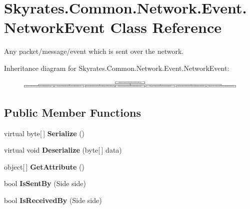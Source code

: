 \hypertarget{class_skyrates_1_1_common_1_1_network_1_1_event_1_1_network_event}{\section{Skyrates.\-Common.\-Network.\-Event.\-Network\-Event Class Reference}
\label{class_skyrates_1_1_common_1_1_network_1_1_event_1_1_network_event}
}


Any packet/message/event which is sent over the network.  


Inheritance diagram for Skyrates.\-Common.\-Network.\-Event.\-Network\-Event\-:\begin{figure}[H]
\begin{center}
\leavevmode
\includegraphics[height=0.432432cm]{class_skyrates_1_1_common_1_1_network_1_1_event_1_1_network_event}
\end{center}
\end{figure}
\subsection*{Public Member Functions}
\begin{DoxyCompactItemize}
\item 
\hypertarget{class_skyrates_1_1_common_1_1_network_1_1_event_1_1_network_event_a414cc42ba387e119443091e9924d01f4}{virtual byte\mbox{[}$\,$\mbox{]} {\bfseries Serialize} ()}\label{class_skyrates_1_1_common_1_1_network_1_1_event_1_1_network_event_a414cc42ba387e119443091e9924d01f4}

\item 
\hypertarget{class_skyrates_1_1_common_1_1_network_1_1_event_1_1_network_event_aee813a49a5cd790efdf0f4ad218fec06}{virtual void {\bfseries Deserialize} (byte\mbox{[}$\,$\mbox{]} data)}\label{class_skyrates_1_1_common_1_1_network_1_1_event_1_1_network_event_aee813a49a5cd790efdf0f4ad218fec06}

\item 
\hypertarget{class_skyrates_1_1_common_1_1_network_1_1_event_1_1_network_event_a0c6392daf5577e26be4f0783129a2be2}{object\mbox{[}$\,$\mbox{]} {\bfseries Get\-Attribute} ()}\label{class_skyrates_1_1_common_1_1_network_1_1_event_1_1_network_event_a0c6392daf5577e26be4f0783129a2be2}

\item 
\hypertarget{class_skyrates_1_1_common_1_1_network_1_1_event_1_1_network_event_a39656b8cbfffef7942a82d6792e41592}{bool {\bfseries Is\-Sent\-By} (Side side)}\label{class_skyrates_1_1_common_1_1_network_1_1_event_1_1_network_event_a39656b8cbfffef7942a82d6792e41592}

\item 
\hypertarget{class_skyrates_1_1_common_1_1_network_1_1_event_1_1_network_event_a9e2411f9fce567505a2823d6e54a7d87}{bool {\bfseries Is\-Received\-By} (Side side)}\label{class_skyrates_1_1_common_1_1_network_1_1_event_1_1_network_event_a9e2411f9fce567505a2823d6e54a7d87}

\end{DoxyCompactItemize}

